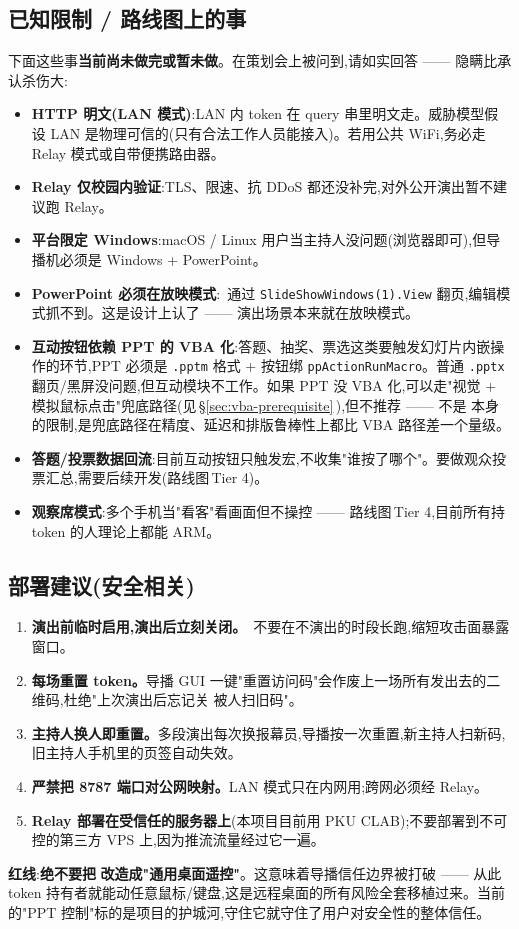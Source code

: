 \subsection{已知限制 / 路线图上的事}

下面这些事\textbf{当前尚未做完或暂未做}。在策划会上被问到,请如实回答 —— 隐瞒比承认杀伤大:

\begin{itemize}
  \item \textbf{HTTP 明文(LAN 模式)}:LAN 内 token 在 query 串里明文走。威胁模型假设 LAN 是物理可信的(只有合法工作人员能接入)。若用公共 WiFi,务必走 Relay 模式或自带便携路由器。
  \item \textbf{Relay 仅校园内验证}:TLS、限速、抗 DDoS 都还没补完,对外公开演出暂不建议跑 Relay。
  \item \textbf{平台限定 Windows}:macOS / Linux 用户当主持人没问题(浏览器即可),但导播机必须是 Windows + PowerPoint。
  \item \textbf{PowerPoint 必须在放映模式}:\app\ 通过 \texttt{SlideShowWindows(1).View} 翻页,编辑模式抓不到。这是设计上认了 —— 演出场景本来就在放映模式。
  \item \textbf{互动按钮依赖 PPT 的 VBA 化}:答题、抽奖、票选这类要触发幻灯片内嵌操作的环节,PPT 必须是 \texttt{.pptm} 格式 + 按钮绑 \texttt{ppActionRunMacro}。普通 \texttt{.pptx} 翻页/黑屏没问题,但互动模块不工作。如果 PPT 没 VBA 化,可以走"视觉 + 模拟鼠标点击"兜底路径(见\,\S\ref{sec:vba-prerequisite}\,),但不推荐 —— 不是\,\app\,本身的限制,是兜底路径在精度、延迟和排版鲁棒性上都比 VBA 路径差一个量级。
  \item \textbf{答题/投票数据回流}:目前互动按钮只触发宏,不收集"谁按了哪个"。要做观众投票汇总,需要后续开发(路线图\,Tier 4)。
  \item \textbf{观察席模式}:多个手机当"看客"看画面但不操控 —— 路线图\,Tier 4,目前所有持 token 的人理论上都能 ARM。
\end{itemize}

\subsection{部署建议(安全相关)}

\begin{enumerate}
  \item \textbf{演出前临时启用,演出后立刻关闭。}\app\ 不要在不演出的时段长跑,缩短攻击面暴露窗口。
  \item \textbf{每场重置 token。}导播 GUI 一键"重置访问码"会作废上一场所有发出去的二维码,杜绝"上次演出后忘记关\,\app\,被人扫旧码"。
  \item \textbf{主持人换人即重置。}多段演出每次换报幕员,导播按一次重置,新主持人扫新码,旧主持人手机里的页签自动失效。
  \item \textbf{严禁把 8787 端口对公网映射。}LAN 模式只在内网用;跨网必须经 Relay。
  \item \textbf{Relay 部署在受信任的服务器上}(本项目目前用 PKU CLAB);不要部署到不可控的第三方 VPS 上,因为推流流量经过它一遍。
\end{enumerate}

\begin{warnbox}
\textbf{红线}:\textbf{绝不要把\,\app\,改造成"通用桌面遥控"}。这意味着导播信任边界被打破 —— 从此 token 持有者就能动任意鼠标/键盘,这是远程桌面的所有风险全套移植过来。当前的"PPT 控制"标的是项目的护城河,守住它就守住了用户对安全性的整体信任。
\end{warnbox}
